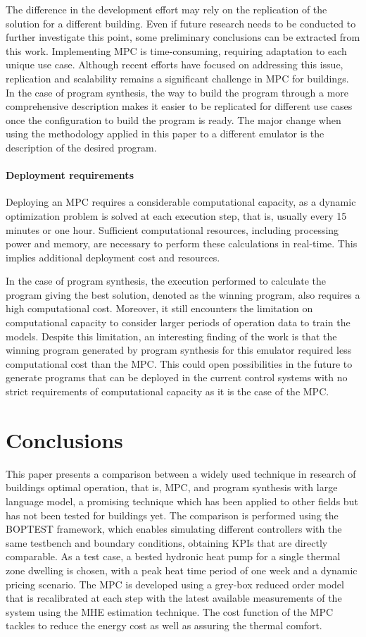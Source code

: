 The difference in the development effort may rely on the replication of the solution for a different building. Even if future research needs to be conducted to further investigate this point, some preliminary conclusions can be extracted from this work. Implementing MPC is time-consuming, requiring adaptation to each unique use case. Although recent efforts have focused on addressing this issue, replication and scalability remains a significant challenge in MPC for buildings. In the case of program synthesis, the way to build the program through a more comprehensive description makes it easier to be replicated for different use cases once the configuration to build the program is ready. The major change when using the methodology applied in this paper to a different emulator is the description of the desired program.

\paragraph{Deployment requirements}
Deploying an MPC requires a considerable computational capacity, as a dynamic optimization problem is solved at each execution step, that is, usually every 15 minutes or one hour. Sufficient computational resources, including processing power and memory, are necessary to perform these calculations in real-time. This implies additional deployment cost and resources.

In the case of program synthesis, the execution performed to calculate the program giving the best solution, denoted as the winning program, also requires a high computational cost. Moreover, it still encounters the limitation on computational capacity to consider larger periods of operation data to train the models. Despite this limitation, an interesting finding of the work is that the winning program generated by program synthesis for this emulator required less computational cost than the MPC. This could open possibilities in the future to generate programs that can be deployed in the current control systems with no strict requirements of computational capacity as it is the case of the MPC.

\section{Conclusions}
\label{sec:conclusion}
This paper presents a comparison between a widely used technique in research of buildings optimal operation, that is, MPC, and program synthesis with large language model, a promising technique which has been applied to other fields but has not been tested for buildings yet. The comparison is performed using the BOPTEST framework, which enables simulating different controllers with the same testbench and boundary conditions, obtaining KPIs that are directly comparable. As a test case, a bested hydronic heat pump for a single thermal zone dwelling is chosen, with a peak heat time period of one week and a dynamic pricing scenario. The MPC is developed using a grey-box reduced order model that is recalibrated at each step with the latest available measurements of the system using the MHE estimation technique. The cost function of the MPC tackles to reduce the energy cost as well as assuring the thermal comfort. 

